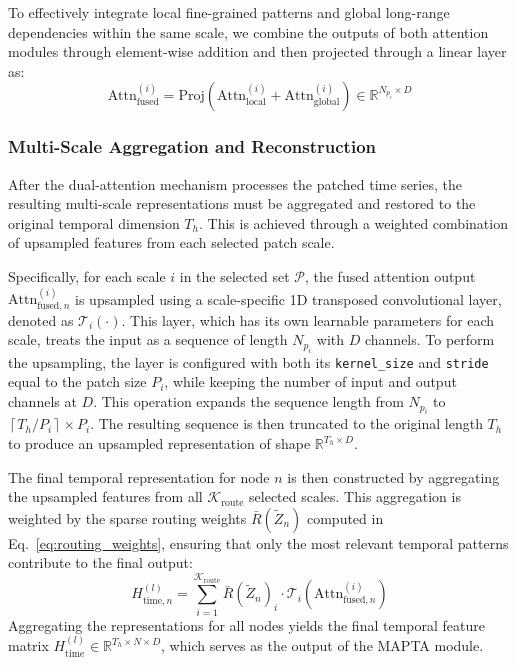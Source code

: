 \documentclass[5p,times,authoryear]{elsarticle}
\begin{document}
To effectively integrate local fine-grained patterns and global long-range dependencies within the same scale, we combine the outputs of both attention modules through element-wise addition and then projected through a linear layer as:
\vspace{-3pt}
\begin{equation} 
\label{eq:fused_attn}
    \text{Attn}^{(i)}_{\mathrm{fused}}
    = \mathrm{Proj}\!\left(
        \text{Attn}^{(i)}_{\mathrm{local}}
        +
        \text{Attn}^{(i)}_{\mathrm{global}}
    \right)
    \in \mathbb{R}^{N_{p_i} \times D}
\end{equation}
\vspace{-5pt}

\subsubsection{Multi-Scale Aggregation and Reconstruction}
After the dual-attention mechanism processes the patched time series, the resulting multi-scale representations must be aggregated and restored to the original temporal dimension $T_h$. This is achieved through a weighted combination of upsampled features from each selected patch scale.

Specifically, for each scale $i$ in the selected set $\mathcal{P}$, the fused attention output $\text{Attn}^{(i)}_{\text{fused},n}$ is upsampled using a scale-specific 1D transposed convolutional layer, denoted as $\mathcal{T}_i(\cdot)$. This layer, which has its own learnable parameters for each scale, treats the input as a sequence of length $N_{p_i}$ with $D$ channels. To perform the upsampling, the layer is configured with both its \texttt{kernel\_size} and \texttt{stride} equal to the patch size $P_i$, while keeping the number of input and output channels at $D$. This operation expands the sequence length from $N_{p_i}$ to $\left\lceil T_h/P_i \right\rceil  \times P_i$. The resulting sequence is then truncated to the original length $T_h$ to produce an upsampled representation of shape $\mathbb{R}^{T_h \times D}$.


The final temporal representation for node $n$ is then constructed by aggregating the upsampled features from all $\mathcal{K}_{\mathrm{route}}$ selected scales. This aggregation is weighted by the sparse routing weights $\bar{R}(\tilde{Z}_{n})$ computed in Eq.~\eqref{eq:routing_weights}, ensuring that only the most relevant temporal patterns contribute to the final output:
\vspace{-3pt}
\begin{equation}
\label{eq:final_temporal_output}
    H^{(l)}_{\mathrm{time},n}
    =
    \sum_{i=1}^{\mathcal{K}_{\mathrm{route}}}
    \bar{R}(\tilde{Z}_{n})_i \cdot
    \mathcal{T}_i\!\left(
        \text{Attn}^{(i)}_{\mathrm{fused},n}
    \right)
\end{equation}
Aggregating the representations for all nodes yields the final temporal feature matrix $H_{\text{time}}^{(l)} \in \mathbb{R}^{T_h \times N \times D}$, which serves as the output of the MAPTA module.
\end{document}

